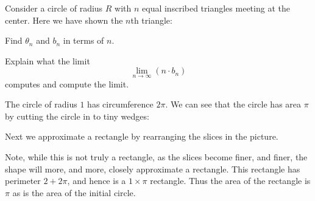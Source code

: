 \documentclass[hints,handout,noauthor,nooutcomes,12pt]{ximera}
\begin{document}
\begin{problem}
Consider a circle of radius $R$ with $n$ equal inscribed triangles
meeting at the center.  Here we have shown the $n$th triangle:
\begin{image}
\end{image}
Find $\theta_n$ and $b_n$ in terms of $n$.
\end{problem}


\begin{problem}
Explain what the limit
\[
\lim_{n\to\infty} \left(n\cdot b_n\right)
\]
computes and compute the limit.
\end{problem}



The circle of radius $1$ has circumference $2\pi$. We can see that the
circle has area $\pi$ by cutting the circle in to tiny wedges:
\begin{image}
\end{image}

Next we approximate a rectangle by rearranging the slices in the
picture. 
\begin{image}
\end{image}
Note, while this is not truly a rectangle, as the slices become finer,
and finer, the shape will more, and more, closely approximate a
rectangle. This rectangle has perimeter $2+2\pi$, and hence is a
$1\times \pi$ rectangle. Thus the area of the rectangle is $\pi$ as is
the area of the initial circle.
\end{document}
